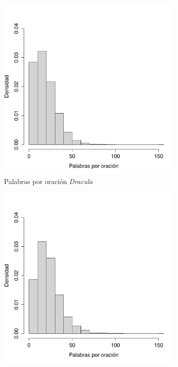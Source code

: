 \documentclass[paper=leter, fontsize=11pt]{scrartcl}
\numberwithin{equation}{section}		%
\numberwithin{figure}{section}			%
\numberwithin{table}{section}				%
\begin{document}
\begin{figure}
    \begin{subfigure}{.5\textwidth}
        \centering
        \includegraphics[scale=0.4]{dra_palabras.pdf}
        \caption{Palabras por oración \textit{Dracula}}
        \label{dra_palabras}
    \end{subfigure}
    \begin{subfigure}{0.5\textwidth}
        \centering
        \includegraphics[scale=0.4]{fra_palabras.pdf}

\end{subfigure}
\end{figure}
\end{document}

